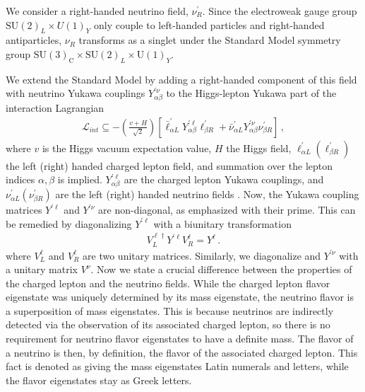 We consider a right-handed neutrino field, $\nu^\prime_R$. Since the electroweak gauge group $\text{SU}(2)_L \times U(1)_Y$ only couple to 
left-handed particles and right-handed antiparticles, $\nu_R$ transforms as a singlet under the Standard Model symmetry 
group $\mathrm{SU}(3)_{\mathrm{C}} \times \mathrm{SU}(2)_{L} \times \mathrm{U}(1)_{Y}$. 

We extend the Standard Model by adding a right-handed component of this field with neutrino Yukawa couplings $Y_{\alpha \beta}^{\prime \nu}$ to the Higgs-lepton Yukawa part of the interaction Lagrangian 
\begin{align} 
    \mathcal{L}_{int} \subseteq -\left( \frac{v + H}{\sqrt{2}} \right) \left[ \bar{\ell}^{\prime}_{\alpha L} Y_{\alpha \beta}^{\prime \ell} \ell_{\beta R}^{\prime} + \bar{\nu}_{\alpha L}^{\prime} Y_{\alpha \beta}^{\prime \nu} \nu_{\beta R}^{\prime}\right]\,,
\end{align}
where $v$ is the Higgs vacuum expectation value, $H$ the Higgs field, $\ell_{\alpha L}^\prime (\ell_{\beta R}^\prime)$ the left (right) handed charged lepton field, and summation over the lepton indices $\alpha,\beta$ is implied. $Y_{\alpha \beta}^{\prime \ell}$ are the charged lepton Yukawa couplings, and $\nu^\prime_{\alpha L}(\nu^\prime_{\beta R})$ are the left (right) handed neutrino fields .
Now, the Yukawa coupling matrices $Y^{\prime \ell}$ and $Y^{\prime \nu}$ are non-diagonal, as emphasized with their prime. 
This can be remedied by diagonalizing $Y^{\prime \ell}$  with a biunitary transformation
\begin{align}
    V_{ L}^{\ell \dagger} Y^{\prime \ell} V_{ R}^{\ell}=Y^{\ell} \,.
\end{align}
where $V^\ell_L$ and $V^\ell_R$ are two unitary matrices.
Similarly, we diagonalize and $Y^{\prime \nu}$ with a unitary matrix $V^\nu$. 
Now we state a crucial difference between the properties of the charged lepton and the neutrino fields.
While the charged lepton flavor eigenstate was uniquely determined by its mass eigenstate, the neutrino flavor is a superposition of mass eigenstates. 
This is because neutrinos are indirectly detected via the observation of its associated charged lepton, so there is no requirement for neutrino flavor eigenstates to have a definite mass. 
The flavor of a neutrino is then, by definition, the flavor of the associated charged lepton. 
This fact is denoted as giving the mass eigenstates Latin numerals and letters, while the flavor eigenstates stay as Greek letters.


